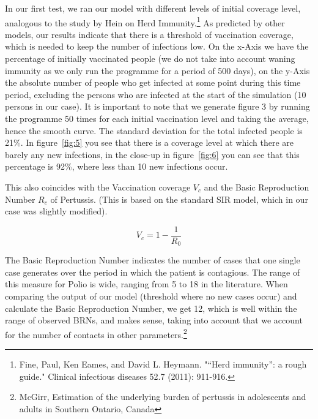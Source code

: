\documentclass[11pt]{article}
\begin{document}
In our first test, we ran our model with different levels of initial coverage level, analogous to the study by Hein on Herd Immunity.\footnote{Fine, Paul, Ken Eames, and David L. Heymann. "“Herd immunity”: a rough guide." Clinical infectious diseases 52.7 (2011): 911-916.} As predicted by other models, our results indicate that there is a threshold of vaccination coverage, which is needed to keep the number of infections low. On the x-Axis we have the percentage of initially vaccinated people (we do not take into account waning immunity as we only run the programme for a period of 500 days), on the y-Axis the absolute number of people who get infected at some point during this time period, excluding the persons who are infected at the start of the simulation (10 persons in our case). It is important to note that we generate figure 3 by running the programme 50 times for each initial vaccination level and taking the average, hence the smooth curve. The standard deviation for the total infected people is 21\%. In figure~\ref{fig:5} you see that there is a coverage level at which there are barely any new infections, in the close-up in figure~\ref{fig:6} you can see that this percentage is 92\%, where less than 10 new infections occur. 

This also coincides with the Vaccination coverage $V_{c}$ and the Basic Reproduction Number $R_{c}$ of Pertussis. (This is based on the standard SIR model, which in our case was slightly modified). 

\begin{equation}
V_{c} = 1-\dfrac{1}{R_{0}}
\end{equation}

The Basic Reproduction Number indicates the number of cases that one single case generates over the period in which the patient is contagious. The range of this measure for Polio is wide, ranging from 5 to 18 in the literature. When comparing the output of our model (threshold where no new cases occur) and calculate the Basic Reproduction Number, we get 12, which is well within the range of observed BRNs, and makes sense, taking into account that we account for the number of contacts in other parameters.\footnote{McGirr, Estimation of the underlying burden of pertussis in adolescents and adults in Southern Ontario, Canada} 
\end{document}
